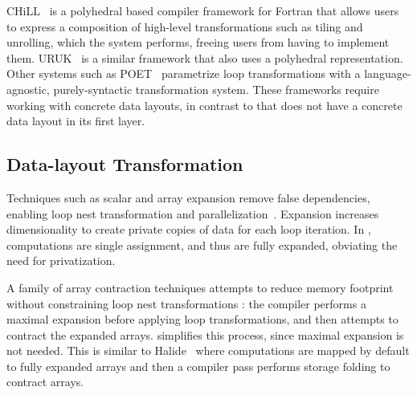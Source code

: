 CHiLL~\cite{chill,Hall2010} is a polyhedral based compiler framework for Fortran that allows users to express a composition of high-level transformations such as tiling and unrolling, which the system
performs, freeing users from having to implement them. 
URUK~\cite{Girbal2006} is a similar framework that also uses a polyhedral representation.  Other systems such as POET~\cite{Yi:2007ay} parametrize loop transformations with a language-agnostic, purely-syntactic transformation system.  These frameworks require working with concrete data layouts, in contrast to \framework that does not have a concrete data layout in its first layer.

\subsection{Data-layout Transformation}

Techniques such as scalar and array expansion remove false dependencies, enabling loop nest transformation and parallelization~\cite{feautrier_array_1988,kennedy_optimizing_2002}.
Expansion increases dimensionality to create private copies of data for each loop iteration.  In \framework, computations are single assignment, and thus are fully expanded, obviating the need for privatization.

A family of array contraction techniques attempts to reduce memory
footprint without constraining loop nest transformations
\cite{lefebvre_automatic_1998,Qui00,Darte_contraction_2005}: the compiler
performs a maximal expansion before applying loop transformations, and then attempts to contract the expanded arrays.  \framework simplifies this process, since maximal expansion is not needed.  This is similar to Halide~\cite{halide_12} where computations are mapped by default to fully expanded arrays and then a compiler pass performs storage folding to contract arrays.%


